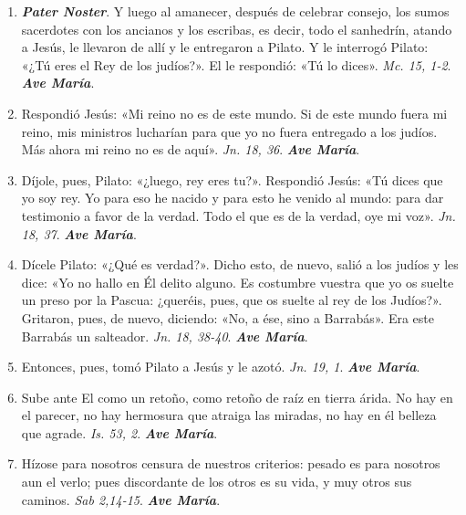 \documentclass[11pt,a4paper]{book}
\begin{document}
    \begin{enumerate}
    
        \item \textbf{\emph{Pater Noster}}. Y luego al amanecer, después de celebrar consejo, los sumos sacerdotes con los ancianos y los escribas, 
            es decir, todo el sanhedrín, atando a Jesús, le llevaron de allí y le entregaron a Pilato. 
            Y le interrogó Pilato: «¿Tú eres el Rey de los judíos?». El le respondió: «Tú lo dices». \emph{Mc. 15, 1-2}. \textbf{\emph{Ave María}}.

        \item Respondió Jesús: «Mi reino no es de este mundo. Si de este mundo fuera mi reino, mis ministros lucharían para 
            que yo no fuera entregado a los judíos. Más ahora mi reino no es de aquí». \emph{Jn. 18, 36}. \textbf{\emph{Ave María}}.

        \item Díjole, pues, Pilato: «¿luego, rey eres tu?». Respondió Jesús: «Tú dices que yo soy rey. Yo para eso he nacido y 
            para esto he venido al mundo: para dar testimonio a favor de la verdad. 
            Todo el que es de la verdad, oye mi voz». \emph{Jn. 18, 37}. \textbf{\emph{Ave María}}.

        \item Dícele Pilato: «¿Qué es verdad?». Dicho esto, de nuevo, salió a los judíos y les dice: 
            «Yo no hallo en Él delito alguno. Es costumbre vuestra que yo os suelte un preso por la Pascua: ¿queréis, pues, 
            que os suelte al rey de los Judíos?». Gritaron, pues, de nuevo, diciendo: «No, a ése, sino a Barrabás». 
            Era este Barrabás un salteador. \emph{Jn. 18, 38-40}. \textbf{\emph{Ave María}}.

        \item Entonces, pues, tomó Pilato a Jesús y le azotó. \emph{Jn. 19, 1}. \textbf{\emph{Ave María}}.

        \item Sube ante El como un retoño, como retoño de raíz en tierra árida. No hay en el parecer, no hay hermosura que atraiga las miradas, no hay en él belleza que agrade.
            \emph{Is. 53, 2}. \textbf{\emph{Ave María}}.

        \item Hízose para nosotros censura de nuestros criterios: pesado es para nosotros aun el verlo; 
            pues discordante de los otros es su vida, y muy otros sus caminos. \emph{Sab 2,14-15}. \textbf{\emph{Ave María}}.


\end{enumerate}
\end{document}
